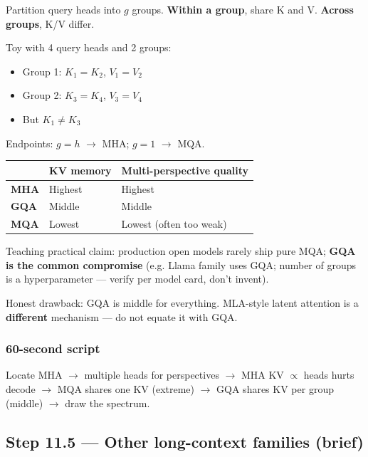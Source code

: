 \documentclass[11pt,a4paper]{article}
\begin{document}
Partition query heads into \(g\) groups. \textbf{Within a group}, share K and V. \textbf{Across groups}, K/V differ.


Toy with 4 query heads and 2 groups:

\begin{itemize}
\item Group 1: \(K_1=K_2\), \(V_1=V_2\)  
\item Group 2: \(K_3=K_4\), \(V_3=V_4\)  
\item But \(K_1 \neq K_3\)
\end{itemize}


Endpoints: \(g=h\) $\rightarrow$ MHA; \(g=1\) $\rightarrow$ MQA.


\begin{table}[ht]
\centering\small
\begin{tabularx}{\textwidth}{@{}YYY@{}}
\toprule
\textbf{} & \textbf{KV memory} & \textbf{Multi-perspective quality} \\
\midrule
\textbf{MHA} & Highest & Highest \\
\textbf{GQA} & Middle & Middle \\
\textbf{MQA} & Lowest & Lowest (often too weak) \\
\bottomrule
\end{tabularx}
\end{table}


Teaching practical claim: production open models rarely ship pure MQA; \textbf{GQA is the common compromise} (e.g. Llama family uses GQA; number of groups is a hyperparameter --- verify per model card, don't invent).


Honest drawback: GQA is middle for everything. MLA-style latent attention is a \textbf{different} mechanism --- do not equate it with GQA.


\subsubsection{60-second script}

Locate MHA $\rightarrow$ multiple heads for perspectives $\rightarrow$ MHA KV $\propto$ heads hurts decode $\rightarrow$ MQA shares one KV (extreme) $\rightarrow$ GQA shares KV per group (middle) $\rightarrow$ draw the spectrum.


\subsection{Step 11.5 --- Other long-context families (brief)}
\end{document}
